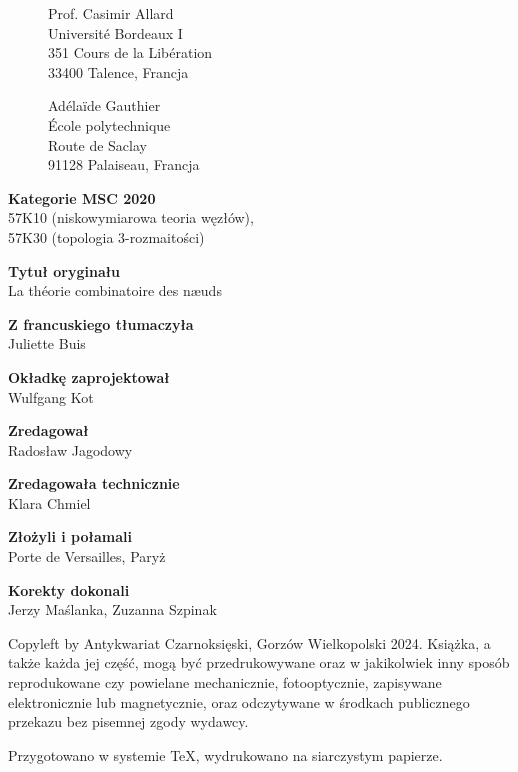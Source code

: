 

\thispagestyle{empty}
\begin{figure}[H]
\begin{minipage}[b]{.48\linewidth}
{\noindent Prof. Casimir Allard\\
Université Bordeaux I\\
351 Cours de la Libération\\
33400 Talence, Francja}
\end{minipage}
\begin{minipage}[b]{.48\linewidth}
{\noindent Adélaïde Gauthier\\
École polytechnique\\
Route de Saclay\\
91128 Palaiseau, Francja}
\end{minipage}
\end{figure}

{\noindent \textbf{Kategorie MSC 2020}\\57K10 (niskowymiarowa teoria węzłów),\\57K30 (topologia 3-rozmaitości)} \vspace{5mm}

{\noindent \textbf{Tytuł oryginału}\\La théorie combinatoire des næuds}
\vspace{5mm}

{\noindent \textbf{Z francuskiego tłumaczyła}\\Juliette Buis} 
\vspace{5mm}

{\noindent \textbf{Okładkę zaprojektował}\\Wulfgang Kot}
\vspace{5mm}

{\noindent \textbf{Zredagował}\\Radosław Jagodowy}
\vspace{5mm}

{\noindent \textbf{Zredagowała technicznie}\\Klara Chmiel}
\vspace{5mm}

{\noindent \textbf{Złożyli i połamali}\\Porte de Versailles, Paryż}
\vspace{5mm}

{\noindent \textbf{Korekty dokonali}\\Jerzy Maślanka, Zuzanna Szpinak}

\vfill

{\noindent Copyleft by Antykwariat Czarnoksięski, Gorzów Wielkopolski 2024.
Książka, a także każda jej część, mogą być przedrukowywane oraz w jakikolwiek inny sposób reprodukowane czy powielane mechanicznie, fotooptycznie, zapisywane elektronicznie lub magnetycznie, oraz odczytywane w środkach publicznego przekazu bez pisemnej zgody wydawcy.}

\vspace{5mm}

{\noindent Przygotowano w systemie \TeX, wydrukowano na siarczystym papierze.}


